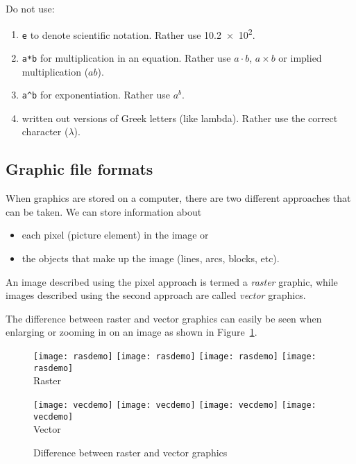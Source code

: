 \documentclass[a4paper,12pt]{article}
\begin{document}
Do not use:
\begin{enumerate}
\item \verb|e| to denote scientific notation.  Rather use
  \num{10.2e2}.
\item \verb|a*b| for multiplication in an equation. Rather use
  $a \cdot b$, $a \times b $ or implied multiplication ($ab$).
\item \verb|a^b| for exponentiation.  Rather use $a^b$.
\item written out versions of Greek letters (like lambda).  Rather use
  the correct character ($\lambda$).
\end{enumerate}

\subsection{Graphic file formats}
When graphics are stored on a computer, there are two different
approaches that can be taken.  We can store information about
\begin{itemize}
\item each pixel (picture element) in the image or
\item the objects that make up the image (lines, arcs, blocks, etc).
\end{itemize}

An image described using the pixel approach is termed a \emph{raster}
graphic, while images described using the second approach are called
\emph{vector} graphics.

The difference between raster and vector graphics can easily be seen
when enlarging or zooming in on an image as shown in
Figure~\ref{fig:rastervector}.

\begin{figure}[htbp]
  \centering
  \begin{minipage}{0.4\linewidth}
    \centering
    \texttt{[image: rasdemo]}
    \texttt{[image: rasdemo]}
    \texttt{[image: rasdemo]}
    \texttt{[image: rasdemo]}\\
    Raster
  \end{minipage}
  \begin{minipage}{0.4\linewidth}
    \centering
    \texttt{[image: vecdemo]}
    \texttt{[image: vecdemo]}
    \texttt{[image: vecdemo]}
    \texttt{[image: vecdemo]}\\
    Vector
  \end{minipage}
  \caption{Difference between raster and vector graphics}
  \label{fig:rastervector}
\end{figure}
\end{document}
